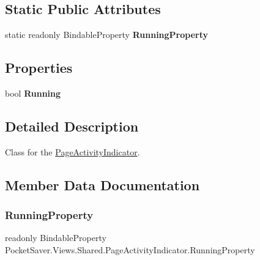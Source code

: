 \subsection*{Static Public Attributes}
\begin{DoxyCompactItemize}
\item 
static readonly Bindable\+Property {\bfseries Running\+Property}
\end{DoxyCompactItemize}
\subsection*{Properties}
\begin{DoxyCompactItemize}
\item 
\mbox{\label{class_pocket_saver_1_1_views_1_1_shared_1_1_page_activity_indicator_a96fd76ee472796640439c1cadd3d0d92}} 
bool {\bfseries Running}
\end{DoxyCompactItemize}


\subsection{Detailed Description}
Class for the \hyperlink{class_pocket_saver_1_1_views_1_1_shared_1_1_page_activity_indicator}{Page\+Activity\+Indicator}. 



\subsection{Member Data Documentation}
\mbox{\label{class_pocket_saver_1_1_views_1_1_shared_1_1_page_activity_indicator_a86bdcba4778c1358d04628cbc90bf0b9}} 
\subsubsection{\texorpdfstring{Running\+Property}{RunningProperty}}
{\footnotesize\ttfamily readonly Bindable\+Property Pocket\+Saver.\+Views.\+Shared.\+Page\+Activity\+Indicator.\+Running\+Property\hspace{0.3cm}{\ttfamily [static]}}

